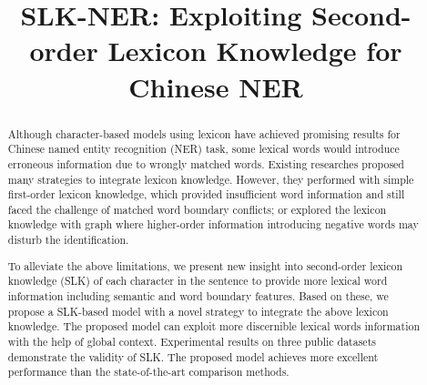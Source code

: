\documentclass[conference]{IEEEtran}
\begin{document}
\title{
SLK-NER: Exploiting Second-order Lexicon Knowledge for Chinese NER
}

\author{
  
}





\maketitle
\newcommand\blfootnote[1]{\begingroup 
\renewcommand\thefootnote{}\footnote{#1}\addtocounter{footnote}{-1}\endgroup 
}

\begin{abstract}
    Although character-based models using lexicon have achieved promising results 
    for Chinese named entity recognition (NER) task,
some lexical words would introduce
    erroneous information due to wrongly matched words. Existing researches proposed many strategies to 
    integrate lexicon knowledge.
However, they performed with simple first-order lexicon knowledge,
    which provided insufficient word information and still faced the challenge of matched word boundary conflicts;
    or explored the lexicon knowledge with graph 
where higher-order information introducing negative words may disturb the identification.


    To alleviate the above limitations, 
    we present new insight into second-order lexicon knowledge (SLK) of each character in the sentence
    to provide more lexical word information including semantic and word boundary features.
    Based on these, we propose a SLK-based model 
    with a novel strategy to integrate the above lexicon knowledge.
    The proposed model can exploit more discernible lexical words information
    with the help of global context.
Experimental results on three public datasets demonstrate the validity of SLK.
    The proposed model achieves more excellent performance than the state-of-the-art comparison methods.
    
\end{abstract}
\end{document}
